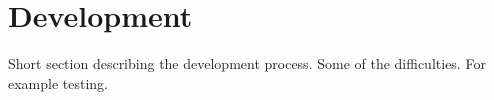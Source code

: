 \chapter{Development}

Short section describing the development process. 
Some of the difficulties. For example testing. 


